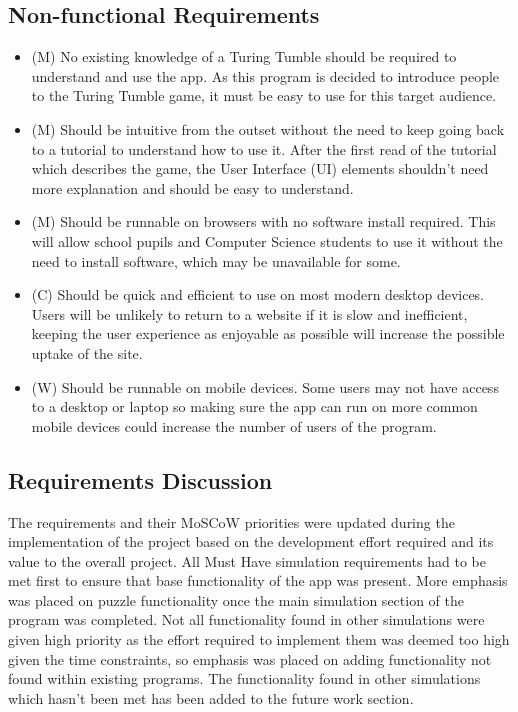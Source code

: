 \documentclass{l4proj}
\begin{document}
\subsection{Non-functional Requirements}
\begin{itemize}
    \item (M) No existing knowledge of a Turing Tumble should be required to understand and use the app. As this program is decided to introduce people to the Turing Tumble game, it must be easy to use for this target audience.
    \item (M) Should be intuitive from the outset without the need to keep going back to a tutorial to understand how to use it. After the first read of the tutorial which describes the game, the User Interface (UI) elements shouldn't need more explanation and should be easy to understand.
    \item (M) Should be runnable on browsers with no software install required. This will allow school pupils and Computer Science students to use it without the need to install software, which may be unavailable for some.
    \item (C) Should be quick and efficient to use on most modern desktop devices. Users will be unlikely to return to a website if it is slow and inefficient, keeping the user experience as enjoyable as possible will increase the possible uptake of the site.
    \item (W) Should be runnable on mobile devices. Some users may not have access to a desktop or laptop so making sure the app can run on more common mobile devices could increase the number of users of the program.
\end{itemize}

\subsection{Requirements Discussion}
The requirements and their MoSCoW priorities were updated during the implementation of the project based on the development effort required and its value to the overall project. All Must Have simulation requirements had to be met first to ensure that base functionality of the app was present. More emphasis was placed on puzzle functionality once the main simulation section of the program was completed. Not all functionality found in other simulations were given high priority as the effort required to implement them was deemed too high given the time constraints, so emphasis was placed on adding functionality not found within existing programs. The functionality found in other simulations which hasn't been met has been added to the future work section.
\end{document}
